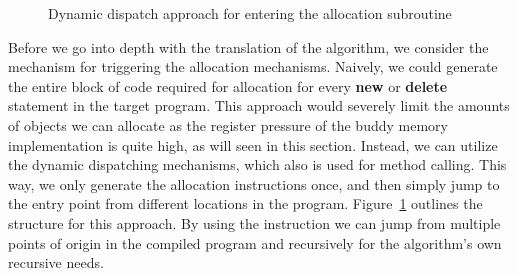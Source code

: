\begin{figure}[ht]
    \centering
    \caption{Dynamic dispatch approach for entering the allocation subroutine}
    \label{fig:buddy-allocation-entry}
\end{figure}

Before we go into depth with the translation of the algorithm, we consider the mechanism for triggering the allocation mechanisms. Naively, we could generate the entire block of code required for allocation for every \textbf{new} or \textbf{delete} statement in the target program. This approach would severely limit the amounts of objects we can allocate as the register pressure of the buddy memory implementation is quite high, as will seen in this section. Instead, we can utilize the dynamic dispatching mechanisms, which also is used for method calling. This way, we only generate the allocation instructions once, and then simply jump to the entry point from different locations in the program. Figure~\ref{fig:buddy-allocation-entry} outlines the structure for this approach. By using the  instruction we can jump from multiple points of origin in the compiled program and recursively for the algorithm's own recursive needs.  

